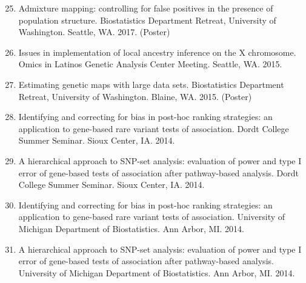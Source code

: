 \documentclass[margin]{res}
\newenvironment{benumerate}[1]{
    \let\oldItem\item
    \def\item{\addtocounter{enumi}{-2}\oldItem}
    
    \begin{enumerate}
    \setcounter{enumi}{#1}
    \addtocounter{enumi}{1}
}{
    \end{enumerate}
}
\begin{document}
\begin{resume}
\begin{benumerate}{24}
\item %
Admixture mapping: controlling for false positives in the presence of population structure. Biostatistics Department Retreat, University of Washington. Seattle, WA. 2017. (Poster)



\item %
Issues in implementation of local ancestry inference on the X chromosome. Omics in Latinos Genetic Analysis Center Meeting. Seattle, WA. 2015.

\item %
Estimating genetic maps with large data sets. Biostatistics Department Retreat, University of Washington. Blaine, WA. 2015. (Poster)


\item %
Identifying and correcting for bias in post-hoc ranking strategies: an application to gene-based rare variant tests of association. Dordt College Summer Seminar. Sioux Center, IA. 2014.

\item %
A hierarchical approach to SNP-set analysis: evaluation of power and type I error of gene-based tests of association after pathway-based analysis. Dordt College Summer Seminar. Sioux Center, IA. 2014.

\item %
Identifying and correcting for bias in post-hoc ranking strategies: an application to gene-based rare variant tests of association. University of Michigan Department of Biostatistics. Ann Arbor, MI. 2014.

\item %
A hierarchical approach to SNP-set analysis: evaluation of power and type I error of gene-based tests of association after pathway-based analysis. University of Michigan Department of Biostatistics. Ann Arbor, MI. 2014.


\end{benumerate}
\end{resume}
\end{document}
